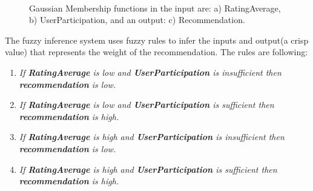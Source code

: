 \begin{figure}[ht!]
   \captionsetup{font=footnotesize}
   \centering
   \hspace{0.1\linewidth}
   \\[20pt]
   \caption{Gaussian Membership functions in the input are: a) RatingAverage, 
   b) UserParticipation, and an output: c) Recommendation.}
   \label{fig:mffis} 
\end{figure}
The fuzzy inference system uses fuzzy rules to infer the inputs and 
output(a crisp value) that represents the weight of the recommendation. 
The rules are following: 
\begin{enumerate}
\item \textit{If \textbf{RatingAverage} is low and 
\textbf{UserParticipation} is insufficient then \textbf{recommendation} is low.}
\item \textit{If \textbf{RatingAverage} is low and 
\textbf{UserParticipation} is sufficient then \textbf{recommendation} is high.}
\item \textit{If \textbf{RatingAverage} is high and 
\textbf{UserParticipation} is insufficient then \textbf{recommendation} is low.}
\item \textit{If \textbf{RatingAverage} is high and 
\textbf{UserParticipation} is sufficient then \textbf{recommendation} is high.}
\end{enumerate}
